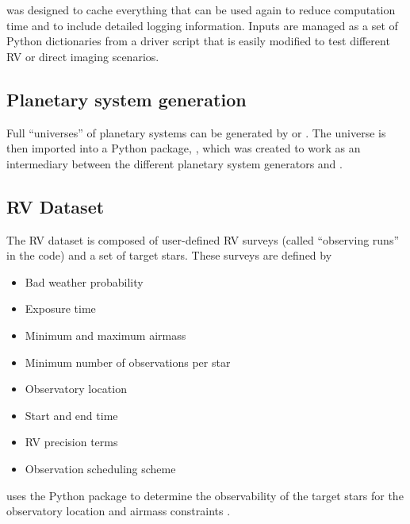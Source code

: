  was designed to cache everything that can be used again to
reduce computation time and to include detailed logging information. Inputs are
managed as a set of Python dictionaries from a driver script that is easily
modified to test different RV or direct imaging scenarios.

\subsection{Planetary system generation}

Full ``universes'' of planetary systems can be generated by  or
 \citep{starkExoVistaSuitePlanetary2022}. The universe is then
imported into a Python package, , which was created to work as
an intermediary between the different planetary system generators and
.

\subsection{RV Dataset}

The RV dataset is composed of user-defined RV surveys (called ``observing runs''
in the code) and a set of target stars. These surveys are defined by
\begin{itemize}
  \item Bad weather probability
  \item Exposure time
  \item Minimum and maximum airmass
  \item Minimum number of observations per star
  \item Observatory location
  \item Start and end time
  \item RV precision terms
  \item Observation scheduling scheme
\end{itemize}
 uses the  Python package to
determine the observability of the target stars for the observatory location and
airmass constraints \citep{morrisAstroplanOpen2018}. 


